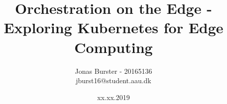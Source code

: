 \pagestyle{fancy}
\fancyhf{}
\title{Orchestration on the Edge -\\ Exploring Kubernetes for Edge Computing}
\author{Jonas Burster - 20165136\\jburst16@student.aau.dk}

\newcommand*{\currentname}{\@currentlabelname}
  \renewcommand{\chaptermark}[1]{%
  \markboth{#1}{}}

\date{xx.xx.2019}
\pagestyle{fancy}
\makeatletter
\let\runtitle\@title
\let\runauthor\@author
\makeatother
\lhead{\runtitle}



